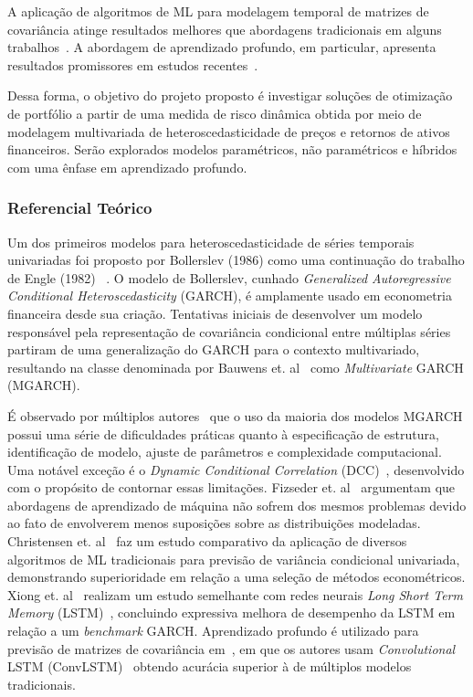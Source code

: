 \documentclass[a4paper, 12pt]{article}
\begin{document}
\begin{spacing}{.9}
A aplicação de algoritmos de ML para modelagem temporal de matrizes de
covariância atinge resultados melhores que abordagens tradicionais em
alguns trabalhos~\cite{svr, ann}. A abordagem de aprendizado profundo, em
particular, apresenta resultados promissores em estudos
recentes~\cite{dl_multi, dl2, fang2021cnn}.

Dessa forma, o objetivo do projeto proposto é investigar soluções de otimização
de portfólio a partir de uma medida de risco dinâmica obtida por meio de
modelagem multivariada de heteroscedasticidade de preços e retornos de
ativos financeiros. Serão explorados modelos paramétricos, não paramétricos
e híbridos com uma ênfase em aprendizado profundo.

\subsubsection*{Referencial Teórico}

Um dos primeiros modelos para heteroscedasticidade de séries temporais
univariadas foi proposto por Bollerslev (1986) como uma continuação do trabalho
de Engle (1982) ~\cite{garch}. O modelo de Bollerslev, cunhado
\emph{Generalized Autoregressive Conditional Heteroscedasticity} (GARCH), é
amplamente usado em econometria financeira desde sua criação. Tentativas
iniciais de desenvolver um modelo responsável pela representação de covariância
condicional entre múltiplas séries partiram de uma generalização do GARCH para
o contexto multivariado, resultando na classe denominada por Bauwens et.
al~\cite{bauwens} como \emph{Multivariate} GARCH (MGARCH).

É observado por múltiplos autores~\cite{bauwens, morettin} que o uso da maioria
dos modelos MGARCH possui uma série de dificuldades práticas quanto à
especificação de estrutura, identificação de modelo, ajuste de parâmetros e
complexidade computacional. Uma notável exceção é o \emph{Dynamic Conditional
Correlation} (DCC)~\cite{dcc}, desenvolvido com o propósito de contornar essas
limitações. Fizseder et. al~\cite{svr} argumentam que abordagens de aprendizado
de máquina não sofrem dos mesmos problemas devido ao fato de envolverem menos
suposições sobre as distribuições modeladas. Christensen et. al~\cite{christensen} faz um estudo
comparativo da aplicação de diversos algoritmos de ML tradicionais para
previsão de variância condicional univariada, demonstrando superioridade em
relação a uma seleção de métodos econométricos. Xiong et. al~\cite{xiong}
realizam um estudo semelhante com redes neurais \emph{Long Short Term Memory}
(LSTM)~\cite{LSTM}, concluindo expressiva melhora de desempenho da LSTM em relação a um
\emph{benchmark} GARCH. Aprendizado profundo é utilizado para previsão de
matrizes de covariância em~\cite{fang2021cnn}, em que os autores usam
\emph{Convolutional} LSTM (ConvLSTM)~\cite{convlstm} obtendo acurácia superior
à de múltiplos modelos tradicionais.



\end{spacing}
\end{document}
